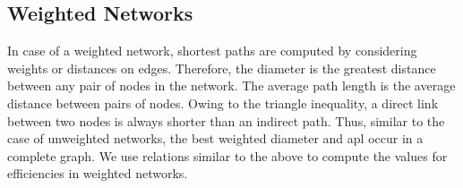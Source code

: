 \documentclass[10pt]{article}
\begin{document}
\subsection{Weighted Networks}

In case of a weighted network, shortest paths are computed by considering weights or distances on edges. Therefore, the diameter is the greatest distance between any pair of nodes in the network. The average path length is the average distance between pairs of nodes. Owing to the triangle inequality, a direct link between two nodes is always shorter than an indirect path. Thus, similar to the case of unweighted networks, the best weighted diameter and apl occur in a complete graph. %
We use relations similar to the above to compute the values for efficiencies in weighted networks.


\end{document}
